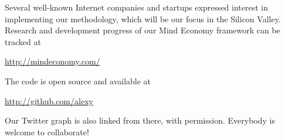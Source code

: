 \documentclass[10pt,oneside]{memoir}
\def\mybibliostyle{plain}
\def\bibliocommand{}
\begin{document}
\begin{Spacing}{2}
Several well-known Internet companies and startups expressed interest in implementing our methodology, which will be our focus in the Silicon Valley.  Research and development progress of our Mind Economy framework can be tracked at


\url{http://mindeconomy.com/}


The code is open source and available at


\url{http://github.com/alexy}


Our Twitter graph is also linked from there, with permission.
Everybody is welcome to collaborate!




\end{Spacing}


%
%

\backmatter


\bibliocommand

\printglossary


\printindex
\end{document}
